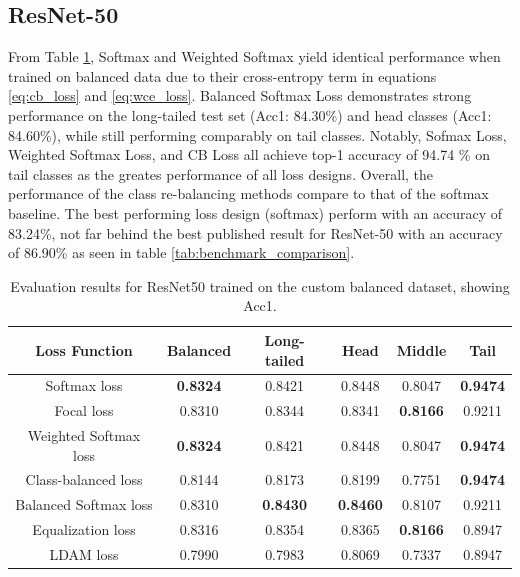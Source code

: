 \subsection{ResNet-50}

From Table \ref{tab:resnet_bal_acc1_1}, Softmax and Weighted Softmax yield identical performance when trained on balanced data due to their cross-entropy term in equations \eqref{eq:cb_loss} and \eqref{eq:wce_loss}. Balanced Softmax Loss demonstrates strong performance on the long-tailed test set (Acc1: 84.30\%) and head classes (Acc1: 84.60\%), while still performing comparably on tail classes. Notably, Sofmax Loss, Weighted Softmax Loss, and CB Loss all achieve top-1 accuracy of 94.74 \% on tail classes as the greates performance of all loss designs. Overall, the performance of the class re-balancing methods compare to that of the softmax baseline. The best performing loss design (softmax) perform with an accuracy of 83.24\%, not far behind the best published result for ResNet-50 with an accuracy of 86.90\% as seen in table \ref{tab:benchmark_comparison}.

\begin{table}[h!]
    \centering
    \caption{Evaluation results for ResNet50 trained on the custom balanced dataset, showing Acc1.}
    \begin{tabular}{cccccc}
        \toprule
        Loss Function & Balanced & Long-tailed & Head & Middle & Tail \\ 
        \midrule
        Softmax loss   & \textbf{0.8324}  & 0.8421 & 0.8448 & 0.8047 & \textbf{0.9474} \\
        Focal loss   & 0.8310  & 0.8344 & 0.8341 & \textbf{0.8166} & 0.9211 \\
        Weighted Softmax loss   & \textbf{0.8324} & 0.8421 & 0.8448 & 0.8047 & \textbf{0.9474} \\
        Class-balanced loss   &  0.8144 & 0.8173 & 0.8199 & 0.7751 & \textbf{0.9474} \\
        Balanced Softmax loss   & 0.8310 & \textbf{0.8430} & \textbf{0.8460} & 0.8107 & 0.9211 \\
        Equalization loss   & 0.8316 & 0.8354 & 0.8365 & \textbf{0.8166} & 0.8947 \\
        LDAM loss   & 0.7990 & 0.7983 & 0.8069 & 0.7337 & 0.8947 \\
        \bottomrule
    \end{tabular}
    \label{tab:resnet_bal_acc1_1}
\end{table}


